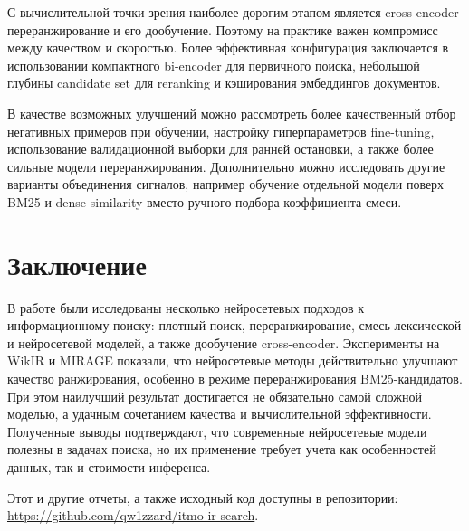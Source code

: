 \documentclass[11pt]{article}
\begin{document}
С вычислительной точки зрения наиболее дорогим этапом является cross-encoder
переранжирование и его дообучение. Поэтому на практике важен компромисс между
качеством и скоростью. Более эффективная конфигурация заключается в
использовании компактного bi-encoder для первичного поиска, небольшой глубины
candidate set для reranking и кэширования эмбеддингов документов.

В качестве возможных улучшений можно рассмотреть более качественный отбор
негативных примеров при обучении, настройку гиперпараметров fine-tuning,
использование валидационной выборки для ранней остановки, а также более сильные
модели переранжирования. Дополнительно можно исследовать другие варианты объединения
сигналов, например обучение отдельной модели поверх BM25 и dense similarity вместо
ручного подбора коэффициента смеси.

\section{Заключение}

В работе были исследованы несколько нейросетевых подходов к информационному поиску:
плотный поиск, переранжирование, смесь лексической и нейросетевой моделей, а также
дообучение cross-encoder. Эксперименты на WikIR и MIRAGE показали, что нейросетевые
методы действительно улучшают качество ранжирования, особенно в режиме
переранжирования BM25-кандидатов. При этом наилучший результат достигается не
обязательно самой сложной моделью, а удачным сочетанием качества и вычислительной
эффективности. Полученные выводы подтверждают, что современные нейросетевые модели
полезны в задачах поиска, но их применение требует учета как особенностей данных,
так и стоимости инференса.

Этот и другие отчеты, а также исходный код доступны в репозитории:
\url{https://github.com/qw1zzard/itmo-ir-search}.
\end{document}
